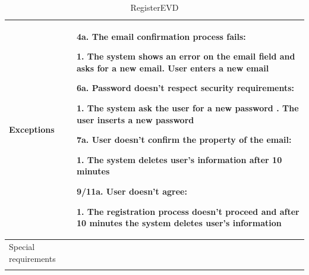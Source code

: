 \begin{center}
\begin{longtable}{p{4cm} p{11cm}}
     \hline
     Exceptions &  
        4a. The email confirmation process fails:
            \begin{adjustwidth}{1cm}{}
            1. The system shows an error on the email field and asks for a new email\newline
            2. User enters a new email
            \end{adjustwidth}
        6a. Password doesn't respect security requirements:
            \begin{adjustwidth}{1cm}{}
            1. The system ask the user for a new password \newline
            2. The user inserts a new password
            \end{adjustwidth}
        7a. User doesn't confirm the property of the email:
            \begin{adjustwidth}{1cm}{}
            1. The system deletes user's information after 10 minutes
            \end{adjustwidth}
        9/11a. User doesn't agree:
            \begin{adjustwidth}{1cm}{}
            1. The registration process doesn't proceed and after 10 minutes the system deletes user's information
            \end{adjustwidth}
        
     \\
     \hline
     Special requirements &  \\
     \hline
    \caption{RegisterEVD}
    \label{tab:RegisterEVD}
    \end{longtable}
\end{center}

